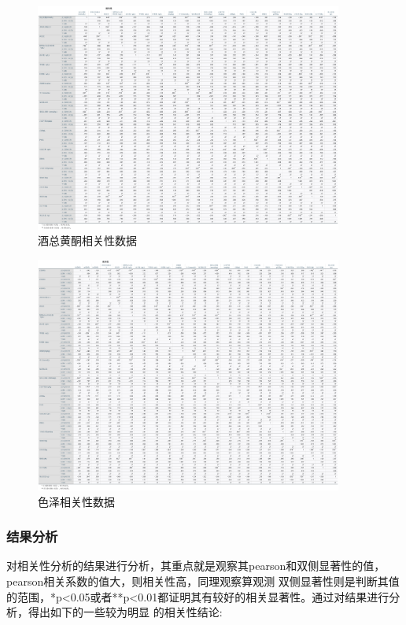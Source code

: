\documentclass[UTF8]{ctexart}
\begin{document}
				\begin{figure}[H]\centering
					\includegraphics[width=0.9\textwidth]{img/酒总黄酮相关性数据.png} %
					\caption{酒总黄酮相关性数据} %
					\label{fig:figure 3} %
					\end{figure}

				\begin{figure}[H]\centering
					\includegraphics[width=0.9\textwidth]{img/色泽相关性数据.png} %
					\caption{色泽相关性数据} %
					\label{fig:figure 4} %
					\end{figure}

				\newpage

			\subsubsection{结果分析}
					对相关性分析的结果进行分析，其重点就是观察其pearson和双侧显著性的值，pearson相关系数的值大，则相关性高，同理观察算观测
					双侧显著性则是判断其值的范围，*p<0.05或者**p<0.01都证明其有较好的相关显著性。通过对结果进行分析，得出如下的一些较为明显
					的相关性结论:
\end{document}

